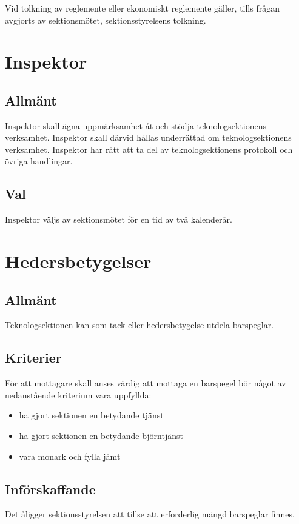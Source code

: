 \documentclass[a4paper]{dtek}
\begin{document}
\subsubsection{}
Vid tolkning av reglemente eller ekonomiskt reglemente gäller, tills frågan avgjorts av sektionsmötet, sektionsstyrelsens tolkning.
\newpage

\section{Inspektor}
\subsection{Allmänt}
Inspektor skall ägna uppmärksamhet åt och stödja teknologsektionens verksamhet. Inspektor skall därvid hållas underrättad om teknologsektionens verksamhet. Inspektor har rätt att ta del av teknologsektionens protokoll och övriga handlingar.
\subsection{Val}
Inspektor väljs av sektionsmötet för en tid av två kalenderår.
\newpage

\section{Hedersbetygelser}
\subsection{Allmänt}
Teknologsektionen kan som tack eller hedersbetygelse utdela barspeglar.
\subsection{Kriterier}
För att mottagare skall anses värdig att mottaga en barspegel bör något av nedanstående kriterium vara uppfyllda:
\begin{itemize}
\item ha gjort sektionen en betydande tjänst
\item ha gjort sektionen en betydande björntjänst
\item vara monark och fylla jämt
\end{itemize}
\subsection{Införskaffande}
Det åligger sektionsstyrelsen att tillse att erforderlig mängd barspeglar finnes.
\end{document}
